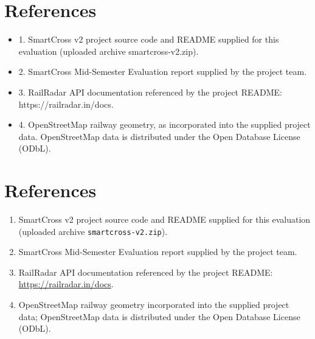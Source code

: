 \documentclass[12pt,a4paper]{report}
\begin{document}
\chapter{References}
\begin{itemize}\item 1. SmartCross v2 project source code and README supplied for this evaluation (uploaded archive smartcross-v2.zip).\end{itemize}
\begin{itemize}\item 2. SmartCross Mid-Semester Evaluation report supplied by the project team.\end{itemize}
\begin{itemize}\item 3. RailRadar API documentation referenced by the project README: https://railradar.in/docs.\end{itemize}
\begin{itemize}\item 4. OpenStreetMap railway geometry, as incorporated into the supplied project data. OpenStreetMap data is distributed under the Open Database License (ODbL).\end{itemize}

\chapter{References}
\begin{enumerate}
\item SmartCross v2 project source code and README supplied for this evaluation (uploaded archive \texttt{smartcross-v2.zip}).
\item SmartCross Mid-Semester Evaluation report supplied by the project team.
\item RailRadar API documentation referenced by the project README: \url{https://railradar.in/docs}.
\item OpenStreetMap railway geometry incorporated into the supplied project data; OpenStreetMap data is distributed under the Open Database License (ODbL).
\end{enumerate}
\end{document}
